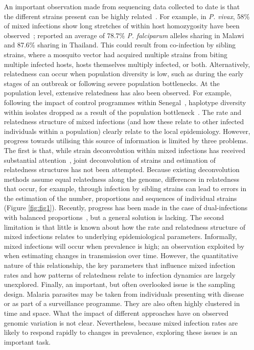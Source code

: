 \documentclass[9pt,lineno]{elife}
\begin{document}
An important observation made from sequencing data collected to date is that the different strains present can be highly related~\citep{Nair2014, Trevino2017}.  For example, in {\it P. vivax}, 58\% of mixed infections show long stretches of within host homozygosity have been observed~\citep{Pearson2016}; \citet{Nkhoma2012} reported an average of 78.7\% {\it P. falciparum} alleles sharing in Malawi and 87.6\% sharing in Thailand. This could result from co-infection by sibling strains, where a mosquito vector had acquired multiple strains from biting multiple infected hosts, hosts themselves multiply infected, or both.  Alternatively, relatedness can occur when population diversity is low, such as during the early stages of an outbreak or following severe population bottlenecks.  At the population level, extensive relatedness has also been observed.  For example, following the impact of control programmes within Senegal~\citep{Mouzin2010}, haplotype diversity within isolates dropped as a result of the population bottleneck~\citep{Wong2017}.
The rate and relatedness structure of mixed infections (and how these relate to other infected individuals within a population) clearly relate to the local epidemiology.  However, progress towards utilising this source of information is limited by three problems.  The first is that, while strain deconvolution within mixed infections has received substantial attention~\citep{Galinsky2015, Jack2016, Chang2017}, joint deconvolution of strains and estimation of relatedness structures has not been attempted.  Because existing deconvolution methods assume equal relatedness along the genome, differences in relatedness that occur, for example, through infection by sibling strains can lead to errors in the estimation of the number, proportions and sequences of individual strains (Figure \ref{fig:fig1}).  Recently, progress has been made in the case of dual-infections with balanced proportions~\citep{Henden2016}, but a general solution is lacking.  The second limitation is that little is known about how the rate and relatedness structure of mixed infections relates to underlying epidemiological parameters.  Informally, mixed infections will occur when prevalence is high; an observation exploited by \citet{Cerqueira2017} when estimating changes in transmission over time.  However, the quantitative nature of this relationship, the key parameters that influence mixed infection rates and how patterns of relatedness relate to infection dynamics are largely unexplored.  Finally, an important, but often overlooked issue is the sampling design.  Malaria parasites may be taken from individuals presenting with disease or as part of a surveillance programme.  They are also often highly clustered in time and space.  What the impact of different approaches have on observed genomic variation is not clear.  Nevertheless, because mixed infection rates are likely to respond rapidly to changes in prevalence, exploring these issues is an important task.
\end{document}
